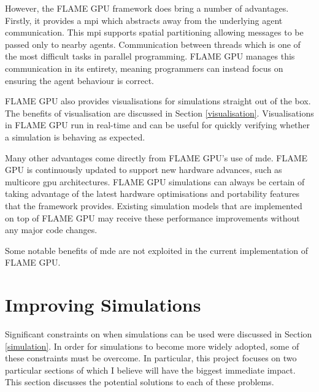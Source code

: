 \documentclass{UoYCSproject}
\begin{document}
However, the \gls{FLAME GPU} framework does bring a number of advantages.
Firstly, it provides a \gls{mpi} which abstracts away from the underlying agent communication.
This \gls{mpi} supports spatial partitioning allowing messages to be passed only to nearby agents.
Communication between threads which is one of the most difficult tasks in parallel programming.
\gls{FLAME GPU} manages this communication in its entirety, meaning programmers can instead focus on ensuring the agent behaviour is correct.

\gls{FLAME GPU} also provides visualisations for simulations straight out of the box.
The benefits of visualisation are discussed in Section \ref{visualisation}.
Visualisations in \gls{FLAME GPU} run in real-time and can be useful for quickly verifying whether a simulation is behaving as expected.

Many other advantages come directly from \gls{FLAME GPU}'s use of \gls{mde}.
\gls{FLAME GPU} is continuously updated to support new hardware advances, such as multicore \acrshort{gpu} architectures\cite{flame_simulation}.
\gls{FLAME GPU} simulations can always be certain of taking advantage of the latest hardware optimisations and portability features that the framework provides.
Existing simulation models that are implemented on top of \gls{FLAME GPU} may receive these performance improvements without any major code changes.

Some notable benefits of \gls{mde} are not exploited in the current implementation of \gls{FLAME GPU}.

\section{Improving Simulations}
\label{improvements}
Significant constraints on when simulations can be used were discussed in Section \ref{simulation}.
In order for simulations to become more widely adopted, some of these constraints must be overcome. 
In particular, this project focuses on two particular sections of which I believe will have the biggest immediate impact.
This section discusses the potential solutions to each of these problems.
\end{document}
